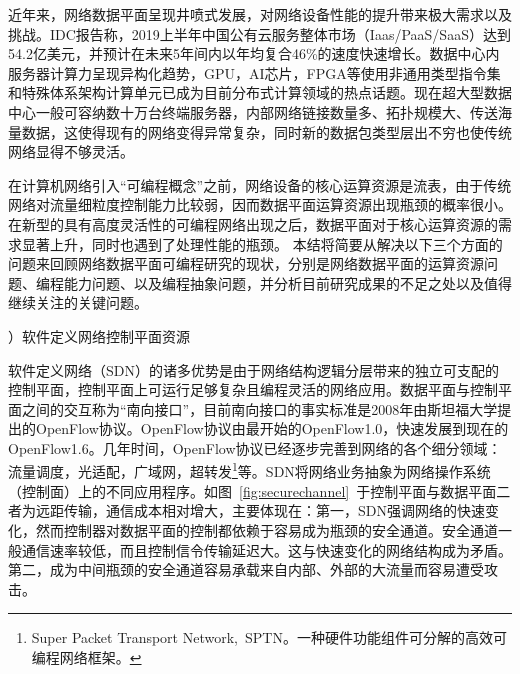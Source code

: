 \label{chap12}

近年来，网络数据平面呈现井喷式发展，对网络设备性能的提升带来极大需求以及挑战。IDC报告称，2019上半年中国公有云服务整体市场（Iaas/PaaS/SaaS）达到54.2亿美元，并预计在未来5年间内以年均复合46\%的速度快速增长。数据中心内服务器计算力呈现异构化趋势，GPU，AI芯片，FPGA等使用非通用类型指令集和特殊体系架构计算单元已成为目前分布式计算领域的热点话题。现在超大型数据中心一般可容纳数十万台终端服务器，内部网络链接数量多、拓扑规模大、传送海量数据，这使得现有的网络变得异常复杂，同时新的数据包类型层出不穷也使传统网络显得不够灵活。

在计算机网络引入“可编程概念”之前，网络设备的核心运算资源是流表，由于传统网络对流量细粒度控制能力比较弱，因而数据平面运算资源出现瓶颈的概率很小。在新型的具有高度灵活性的可编程网络出现之后，数据平面对于核心运算资源的需求显著上升，同时也遇到了处理性能的瓶颈。
本结将简要从解决以下三个方面的问题来回顾网络数据平面可编程研究的现状，分别是网络数据平面的运算资源问题、编程能力问题、以及编程抽象问题，并分析目前研究成果的不足之处以及值得继续关注的关键问题。




\label{chap121}

{）软件定义网络控制平面资源}




软件定义网络（SDN）的诸多优势是由于网络结构逻辑分层带来的独立可支配的控制平面，控制平面上可运行足够复杂且编程灵活的网络应用。数据平面与控制平面之间的交互称为“南向接口”，目前南向接口的事实标准是2008年由斯坦福大学提出的OpenFlow协议。OpenFlow协议由最开始的OpenFlow1.0，快速发展到现在的OpenFlow1.6。几年时间，OpenFlow协议已经逐步完善到网络的各个细分领域：流量调度，光适配，广域网，超转发\footnote{Super Packet Transport Network,~SPTN。一种硬件功能组件可分解的高效可编程网络框架。}等。SDN将网络业务抽象为网络操作系统（控制面）上的不同应用程序。如图~\ref{fig:securechannel}~于控制平面与数据平面二者为远距传输，通信成本相对增大，主要体现在：第一，SDN强调网络的快速变化，然而控制器对数据平面的控制都依赖于容易成为瓶颈的安全通道。安全通道一般通信速率较低，而且控制信令传输延迟大。这与快速变化的网络结构成为矛盾。第二，成为中间瓶颈的安全通道容易承载来自内部、外部的大流量而容易遭受攻击。

